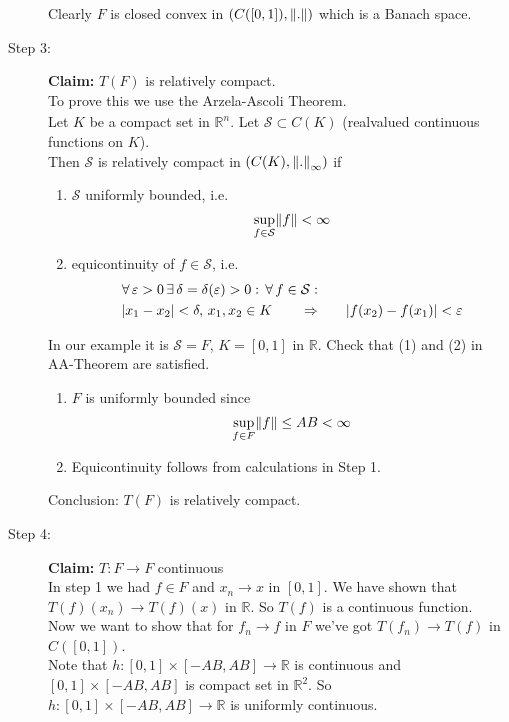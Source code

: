 \begin{beispiel}
\begin{description}
\[	\]
	Clearly $F$ is closed convex in $(C([0,1]),\norm{.})$ which is a Banach space.
	\item[Step 3:] \textbf{Claim:} \text{    }     $T(F)$ is relatively compact. \\
	To prove this we use the Arzela-Ascoli Theorem. \\
	$\phantom{...}$ \\
	Let $K$ be a compact set in $\mathbb{R}^n$. Let $\mathcal{S} \subset C(K)$ (realvalued continuous functions on $K$). \\
	Then $\mathcal{S}$ is relatively compact in $(C(K),\norm{.}_{\infty})$ if 
	\begin{enumerate}[(1)]
		\item $\mathcal{S}$ uniformly bounded, i.e.
		\[
			\sup_{f \in \mathcal{S}} \norm{f} < \infty
		\]
		\item equicontinuity of $f \in \mathcal{S}$, i.e.
		\begin{align*}
			\forall\, \varepsilon>0 \,\exists\, \delta = \delta (\varepsilon) >0: \,\forall\,  f \in \mathcal{S}: & \\
			\lvert x_1-x_2\rvert < \delta, \, x_1,x_2 \in K \qquad \Rightarrow & \qquad \lvert f(x_2)-f(x_1)\rvert< \varepsilon
		\end{align*}
	\end{enumerate}
	In our example it is $\mathcal{S} = F$, $K = [0,1]$ in $\mathbb{R}$. Check that (1) and (2) in AA-Theorem are satisfied. \\
	\begin{enumerate}[(1)]
		\item $F$ is uniformly bounded since
	\[
		\sup_{f \in F}\norm{f} \leq AB < \infty
	\]
	\item Equicontinuity follows from calculations in Step 1. \\
	\end{enumerate}	
	Conclusion: $T(F)$ is relatively compact.
	\item[Step 4:] \textbf{Claim:} \text{    }     $T: F \to F$ continuous \\
	In step 1 we had $f \in F$ and $x_n \to x$ in $[0,1]$. We have shown that $T(f)(x_n) \to T(f)(x)$ in $\mathbb{R}$. So $T(f)$ is a continuous function. \\
	Now we want to show that for $f_n \to f$ in $F$ we've got $T(f_n) \to T(f)$ in $C([0,1])$. \\
	Note that $h: [0,1] \times [-AB,AB] \to \mathbb{R}$ is continuous and $[0,1] \times [-AB,AB]$ is compact set in $\mathbb{R}^2$. So $h: [0,1] \times [-AB,AB] \to \mathbb{R}$ is uniformly continuous. \\

\end{description}
\end{beispiel}

